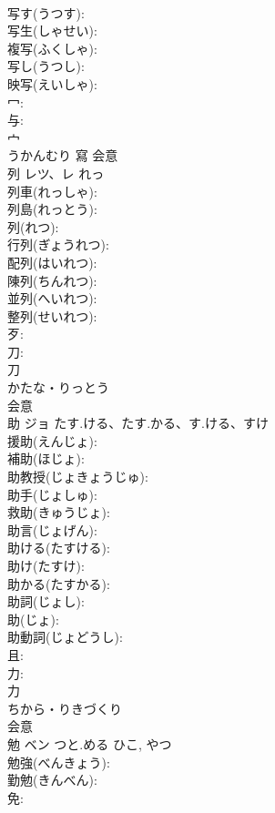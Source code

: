 \documentclass[8pt]{extreport}
\begin{document}
\begin{CJK}{UTF8}{min}
\\	写す(うつす): 
\\	写生(しゃせい): 
\\	複写(ふくしゃ): 
\\	写し(うつし): 
\\	映写(えいしゃ): 
\\	冖: 
\\	与: 
\\	宀	
\\	うかんむり	寫	会意 
\\	列	レツ、レ		れっ	
\\	列車(れっしゃ): 
\\	列島(れっとう): 
\\	列(れつ): 
\\	行列(ぎょうれつ): 
\\	配列(はいれつ): 
\\	陳列(ちんれつ): 
\\	並列(へいれつ): 
\\	整列(せいれつ): 
\\	歹: 
\\	刀: 
\\	刀	
\\	かたな・りっとう	
\\	会意 
\\	助	ジョ	たす.ける、たす.かる、す.ける、すけ		
\\	援助(えんじょ): 
\\	補助(ほじょ): 
\\	助教授(じょきょうじゅ): 
\\	助手(じょしゅ): 
\\	救助(きゅうじょ): 
\\	助言(じょげん): 
\\	助ける(たすける): 
\\	助け(たすけ): 
\\	助かる(たすかる): 
\\	助詞(じょし): 
\\	助(じょ): 
\\	助動詞(じょどうし): 
\\	且: 
\\	力: 
\\	力	
\\	ちから・りきづくり	
\\	会意 
\\	勉	ベン	つと.める	ひこ, やつ	
\\	勉強(べんきょう): 
\\	勤勉(きんべん): 
\\	免: 

\end{CJK}
\end{document}
